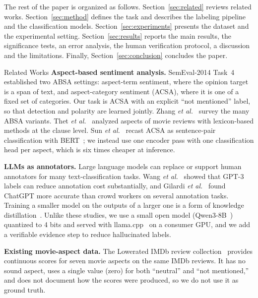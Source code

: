 \documentclass[conference]{IEEEtran}
\makeatletter
\def\section{\@startsection{section}{1}{\z@}{2.2ex plus 1ex minus .5ex}{1ex plus .3ex}%
  {\normalfont\fontsize{12}{14}\selectfont\bfseries\scshape\centering}}
\makeatother
\begin{document}
The rest of the paper is organized as follows. Section~\ref{sec:related} reviews related works. Section~\ref{sec:method} defines the task and describes the labeling pipeline and the classification models. Section~\ref{sec:experiments} presents the dataset and the experimental setting. Section~\ref{sec:results} reports the main results, the significance tests, an error analysis, the human verification protocol, a discussion and the limitations. Finally, Section~\ref{sec:conclusion} concludes the paper.

\section{Related Works}
\label{sec:related}
\textbf{Aspect-based sentiment analysis.} SemEval-2014 Task~4~\cite{pontiki2014} established two ABSA settings: aspect-term sentiment, where the opinion target is a span of text, and aspect-category sentiment (ACSA), where it is one of a fixed set of categories. Our task is ACSA with an explicit ``not mentioned'' label, so that detection and polarity are learned jointly. Zhang \textit{et al.}~\cite{zhang2023survey} survey the many ABSA variants. Thet \textit{et al.}~\cite{thet2010} analyzed aspects of movie reviews with lexicon-based methods at the clause level. Sun \textit{et al.}~\cite{sun2019absa} recast ACSA as sentence-pair classification with BERT~\cite{devlin2019}; we instead use one encoder pass with one classification head per aspect, which is six times cheaper at inference.

\textbf{LLMs as annotators.} Large language models can replace or support human annotators for many text-classification tasks. Wang \textit{et al.}~\cite{wang2021gpt3} showed that GPT-3 labels can reduce annotation cost substantially, and Gilardi \textit{et al.}~\cite{gilardi2023} found ChatGPT more accurate than crowd workers on several annotation tasks. Training a smaller model on the outputs of a larger one is a form of knowledge distillation~\cite{hinton2015}. Unlike these studies, we use a small open model (Qwen3-8B~\cite{qwen3}) quantized to 4 bits and served with llama.cpp~\cite{llamacpp} on a consumer GPU, and we add a verifiable evidence step to reduce hallucinated labels.

\textbf{Existing movie-aspect data.} The Lowerated IMDb review collection~\cite{lowerated} provides continuous scores for seven movie aspects on the same IMDb reviews. It has no sound aspect, uses a single value (zero) for both ``neutral'' and ``not mentioned,'' and does not document how the scores were produced, so we do not use it as ground truth.
\end{document}
